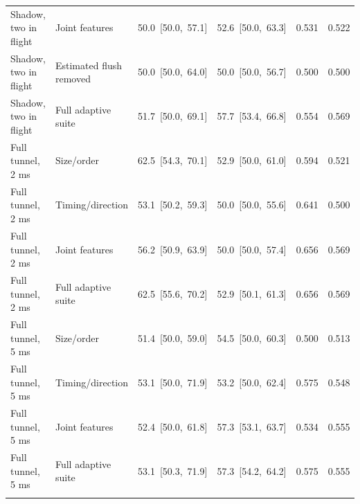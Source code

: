 \begin{table}[htbp]
\begin{tabular}{llrrrr}
Shadow, two in flight & Joint features & \mbox{50.0 [50.0, 57.1]} & \mbox{52.6 [50.0, 63.3]} & 0.531 & 0.522 \\
Shadow, two in flight & Estimated flush removed & \mbox{50.0 [50.0, 64.0]} & \mbox{50.0 [50.0, 56.7]} & 0.500 & 0.500 \\
Shadow, two in flight & Full adaptive suite & \mbox{51.7 [50.0, 69.1]} & \mbox{57.7 [53.4, 66.8]} & 0.554 & 0.569 \\
\addlinespace[2pt]
Full tunnel, 2 ms & Size/order & \mbox{62.5 [54.3, 70.1]} & \mbox{52.9 [50.0, 61.0]} & 0.594 & 0.521 \\
Full tunnel, 2 ms & Timing/direction & \mbox{53.1 [50.2, 59.3]} & \mbox{50.0 [50.0, 55.6]} & 0.641 & 0.500 \\
Full tunnel, 2 ms & Joint features & \mbox{56.2 [50.9, 63.9]} & \mbox{50.0 [50.0, 57.4]} & 0.656 & 0.569 \\
Full tunnel, 2 ms & Full adaptive suite & \mbox{62.5 [55.6, 70.2]} & \mbox{52.9 [50.1, 61.3]} & 0.656 & 0.569 \\
\addlinespace[2pt]
Full tunnel, 5 ms & Size/order & \mbox{51.4 [50.0, 59.0]} & \mbox{54.5 [50.0, 60.3]} & 0.500 & 0.513 \\
Full tunnel, 5 ms & Timing/direction & \mbox{53.1 [50.0, 71.9]} & \mbox{53.2 [50.0, 62.4]} & 0.575 & 0.548 \\
Full tunnel, 5 ms & Joint features & \mbox{52.4 [50.0, 61.8]} & \mbox{57.3 [53.1, 63.7]} & 0.534 & 0.555 \\
Full tunnel, 5 ms & Full adaptive suite & \mbox{53.1 [50.3, 71.9]} & \mbox{57.3 [54.2, 64.2]} & 0.575 & 0.555 \\
\addlinespace[2pt]
\bottomrule\end{tabular}
\end{table}
\clearpage

